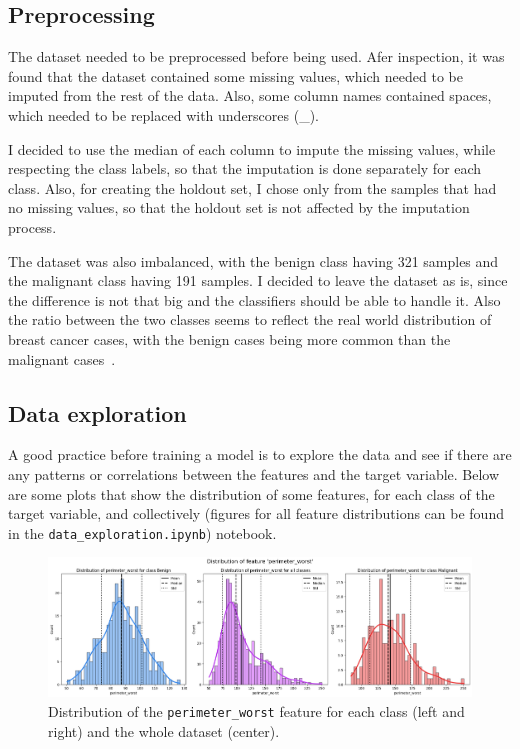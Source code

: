 \documentclass[12pt]{article}
\begin{document}
\subsection{Preprocessing}

The dataset needed to be preprocessed before being used. Afer inspection, it was
found that the dataset contained some missing values, which needed to be
imputed from the rest of the data. Also, some column names contained spaces,
which needed to be replaced with underscores (\_).

I decided to use the median of each column to impute the missing values, while
respecting the class labels, so that the imputation is done separately for each
class. Also, for creating the holdout set, I chose only from the samples that
had no missing values, so that the holdout set is not affected by the imputation
process.

The dataset was also imbalanced, with the benign class having 321 samples and
the malignant class having 191 samples. I decided to leave the dataset as is,
since the difference is not that big and the classifiers should be able to
handle it. Also the ratio between the two classes seems to reflect the real
world distribution of breast cancer cases, with the benign cases being more
common than the malignant cases~\cite{%
Ugiagbe_Olu-Eddo_2011,Bhathal_Brown_Lesueur_Russell_1985}.


\subsection{Data exploration}

A good practice before training a model is to explore the data and see if there
are any patterns or correlations between the features and the target variable.
Below are some plots that show the distribution of some features, for each class
of the target variable, and collectively (figures for all feature distributions
can be found in the \texttt{data\_exploration.ipynb}) notebook.

\begin{figure}[H]
    \centering
    \includegraphics[width=\textwidth]{ims/perimeter_worst.png}
    \caption{Distribution of the \texttt{perimeter\_worst} feature for each
    class (left and right) and the whole dataset (center).}
    \label{fig:perimeter_worst}
\end{figure}
\end{document}
